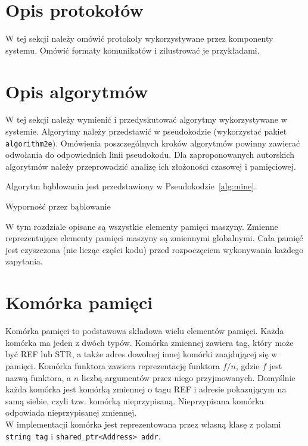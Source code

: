 \section{Opis protokołów}

W tej sekcji należy omówić protokoły wykorzystywane przez komponenty systemu. Omówić formaty komunikatów i zilustrować je przykładami. 

\section{Opis algorytmów}

W tej sekcji należy wymienić i przedyskutować algorytmy wykorzystywane w systemie. Algorytmy należy przedstawić w pseudokodzie (wykorzystać pakiet \texttt{algorithm2e}). Omówienia poszczególnych kroków algorytmów powinny zawierać odwołania do odpowiednich linii pseudokodu. Dla zaproponowanych autorskich algorytmów należy przeprowadzić analizę ich złożoności czasowej i pamięciowej. 

{\color{dgray}
Algorytm bąblowania jest przedstawiony w Pseudokodzie~\ref{alg:mine}.
}

{\small
\begin{pseudokod}[H]
\caption{Wyporność przez bąblowanie}\label{alg:mine}
\end{pseudokod}
}


W tym rozdziale opisane są wszystkie elementy pamięci maszyny. Zmienne reprezentujące elementy pamięci maszyny są zmiennymi globalnymi. Cała pamięć jest czyszczona (nie licząc części kodu) przed rozpoczęciem wykonywania każdego zapytania.

\section{Komórka pamięci}

Komórka pamięci to podstawowa składowa wielu elementów pamięci. Każda komórka ma jeden z dwóch typów. Komórka zmiennej zawiera tag, który może być {REF} lub {STR}, a także adres dowolnej innej komórki znajdującej się w pamięci. Komórka funktora zawiera reprezentację funktora $f/n$, gdzie $f$ jest nazwą funktora, a $n$ liczbą argumentów przez niego przyjmowanych. Domyślnie każda komórka jest komórką zmiennej o tagu {REF} i adresie pokazującym na samą siebie, czyli tzw. komórką nieprzypisaną. Nieprzypisana komórka odpowiada nieprzypisanej zmiennej.\\
W implementacji komórka jest reprezentowana przez własną klasę z polami \texttt{string tag} i \texttt{shared\_ptr<Address> addr}.

